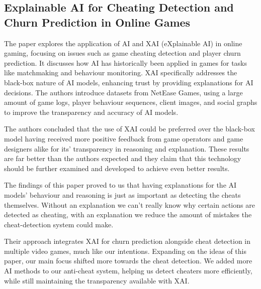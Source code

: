 \subsection{Explainable AI for Cheating Detection and Churn Prediction in Online Games \cite{tao2022explainable}}

The paper explores the application of AI and XAI (eXplainable AI) in online gaming, focusing on issues such as game cheating detection and player churn prediction. It discusses how AI has historically been applied in games for tasks like matchmaking and behaviour monitoring. XAI specifically addresses the black-box nature of AI models, enhancing trust by providing explanations for AI decisions. The authors introduce datasets from NetEase Games, using a large amount of game logs, player behaviour sequences, client images, and social graphs to improve the transparency and accuracy of AI models.

The authors concluded that the use of XAI could be preferred over the black-box model having received more positive feedback from game operators and game designers alike for its’ transparency in reasoning and explanation. These results are far better than the authors expected and they claim that this technology should be further examined and developed to achieve even better results.

The findings of this paper proved to us that having explanations for the AI models' behaviour and reasoning is just as important as detecting the cheats themselves. Without an explanation we can't really know why certain actions are detected as cheating, with an explanation we reduce the amount of mistakes the cheat-detection system could make.

Their approach integrates XAI for churn prediction alongside cheat detection in multiple video games, much like our intentions. Expanding on the ideas of this paper, our main focus shifted more towards the cheat detection. We added more AI methods to our anti-cheat system, helping us detect cheaters more efficiently, while still maintaining the transparency available with XAI.